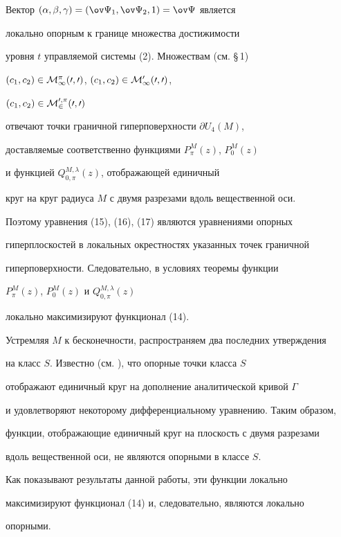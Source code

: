 \begin{pf}


Вектор $(\alpha,\beta,\gamma)=(\ov\Psi_1,\ov\Psi_2,1)=\ov\Psi$ является


локально опорным к границе множества достижимости


уровня $t$ управляемой системы (2). Множествам (см. \S\,1)


$(c_1,c_2)\in\cal M^\pi_1(0,0)$, $(c_1,c_2)\in\cal M^0_1(0,0)$,


$(c_1,c_2)\in\cal M^{0,\pi}_2(0,0)$


отвечают точки граничной гиперповерхности $\partial U_4(M)$,


доставляемые соответственно функциями $P^M_\pi(z)$, $P^M_0(z)$


и функцией $Q^{M,\lambda}_{0,\pi}(z)$, отображающей единичный


круг на круг радиуса $M$ с двумя разрезами вдоль вещественной оси.


Поэтому уравнения (15), (16), (17) являются уравнениями опорных


гиперплоскостей в локальных окрестностях указанных точек граничной


гиперповерхности. Следовательно, в условиях теоремы функции


$P^M_\pi(z)$, $P^M_0(z)$ и $Q^{M,\lambda}_{0,\pi}(z)$


локально максимизируют функционал (14).


\end{pf}





Устремляя $M$ к бесконечности, распространяем два последних утверждения


на класс $S$. Известно (см. \cite{6}), что опорные точки класса $S$


отображают единичный круг на дополнение аналитической кривой $\Gamma$


и удовлетворяют некоторому дифференциальному уравнению. Таким образом,


функции, отображающие единичный круг на плоскость с двумя разрезами


вдоль вещественной оси, не являются опорными в классе $S$.


Как показывают результаты данной работы, эти функции локально


максимизируют функционал (14) и, следовательно, являются локально


опорными.





